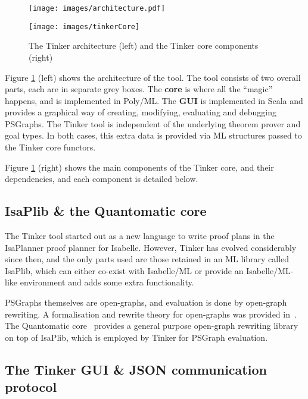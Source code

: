 \documentclass[submission,copyright,creativecommons]{eptcs}
\begin{document}
\begin{figure}[h]
\vspace{-15pt}
\begin{center}
\texttt{[image: images/architecture.pdf]}

\texttt{[image: images/tinkerCore]}
\end{center}
\vspace{-15pt}
\caption{The Tinker architecture (left) and the Tinker core components (right)}\label{fig:arch}
\end{figure}

\noindent Figure \ref{fig:arch} (left) shows the architecture of the tool. The tool consists of two overall parts, each are in separate grey boxes.
The \textbf{core} is where all the ``magic'' happens, and is implemented in Poly/ML. The \textbf{GUI} is implemented in Scala and provides
a graphical way of creating, modifying, evaluating and debugging PSGraphs. The Tinker tool is independent of the underlying theorem prover and goal types. In both cases, this extra data is provided via ML structures passed to the Tinker core functors.

Figure \ref{fig:arch} (right) shows the main components of the Tinker core, and their dependencies, and each component is detailed below.



\subsection{IsaPlib \& the Quantomatic core}\label{sec:quanto}

The Tinker tool started out as a new language to write proof plans in the IsaPlanner proof planner \cite{paper:Dixon:03} for Isabelle. 
However, Tinker has evolved considerably since then, and the only parts used are those  
 retained in an ML library called IsaPlib, which can either co-exist with Isabelle/ML or provide an Isabelle/ML-like environment and adds some extra functionality.



PSGraphs themselves are open-graphs, and evaluation is done by open-graph rewriting. A formalisation and rewrite theory for open-graphs was provided in~\cite{paper:Dixon:10}. The Quantomatic core~\cite{Quantomatic} provides a general purpose open-graph rewriting library on top of IsaPlib, which is employed by Tinker for PSGraph evaluation.

\subsection{The Tinker GUI \& JSON communication protocol}
\end{document}
